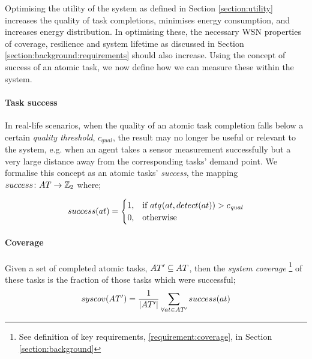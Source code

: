 Optimising the utility of the system as defined in Section \ref{section:utility} increases the quality of task completions, minimises energy consumption, and increases energy distribution. In optimising these, the necessary WSN properties of coverage, resilience and system lifetime as discussed in Section \ref{section:background:requirements} should also increase. Using the concept of success of an atomic task, we now define how we can measure these within the system.

\newcommand{\varQualityMin}[2]{c_{\textit{qual}}}

\newcommand{\formalAtomicTaskSuccess}[2]{
	\functionFormal{success}
	{\setAtomicTask{}{}}
	{\setIntegersBinary{}{}}
}
\newcommand{\functionAtomicTaskSuccess}[2]{
	\functionSignature{success}{\varAtomicTask{}{}}
}

\newcommand{\formalCompositeTaskCoverage}[2]{
	\functionFormal{taskcov}
	{\setCompositeTask{}{}}
	{\setRealNumbersUnit{}{}}
}
\newcommand{\functionCompositeTaskCoverage}[2]{
	\functionSignature{taskcov}{\varCompositeTask{}{}}
}


\newcommand{\functionSystemCoverage}[2]{
	\functionSignature{syscov}{\setAtomicTaskInstance{}{}}
}

\paragraph{Task success}
\label{section:success}
In real-life scenarios, when the quality of an atomic task completion falls below a certain \textit{quality threshold}, $\varQualityMin{}{}$, the result may no longer be useful or relevant to the system, e.g. when an agent takes a sensor measurement successfully but a very large distance away from the corresponding tasks' demand point.  We formalise this concept as an atomic tasks' \textit{success}, the mapping $\formalAtomicTaskSuccess{}{}$ where;

\begin{equation}
	 \functionAtomicTaskSuccess{}{}
	 = 
	\begin{cases}
		1, & \text{if } \functionAtomicTaskQualitySensor{}{} > \varQualityMin{}{} \\
		0, & \text{otherwise}
	\end{cases}
\end{equation}

\paragraph{Coverage}
\label{section:coverage}
Given a set of completed atomic tasks, $\setAtomicTaskInstance{}{} \subseteq \setAtomicTask{}{}$, then the \textit{system coverage} \footnote{See definition of key requirements, \ref{requirement:coverage}, in Section \ref{section:background}} of these tasks is the fraction of those tasks which were successful;
\begin{equation}
	\label{eq:coverage}
	\functionSystemCoverage{}{}
	=
	\frac{1}{\funcSize{\setAtomicTaskInstance{}{}}}
	\sum\limits_{\forall \varAtomicTask{}{} \in \setAtomicTaskInstance{}{}}
	\functionAtomicTaskSuccess{}{}
\end{equation}

